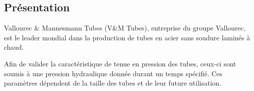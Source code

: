 \begin{multicols}{2}
\setcounter{exo}{0}

\subsection*{Présentation}
\ifprof
\else
Vallourec \& Mannesmann Tubes (V\&M Tubes), entreprise du groupe Vallourec, est le leader mondial dans la production de tubes en acier sans soudure laminés à chaud. %

Afin de valider la caractéristique de tenue en pression des tubes, ceux-ci sont soumis à une pression hydraulique donnée durant un temps spécifié. Ces paramètres dépendent de la taille des tubes et de leur future utilisation.


\end{multicols}
